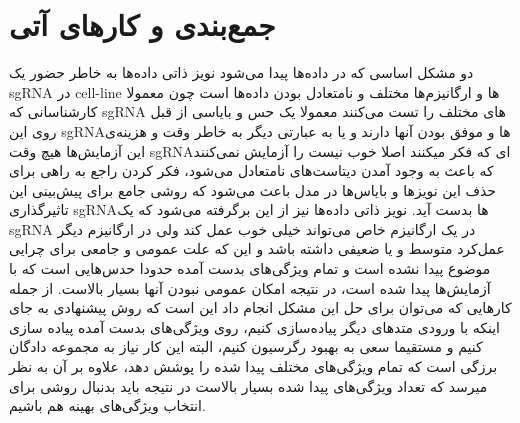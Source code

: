 \documentclass[12pt,a4paper,BCOR=.7cm,headsepline,bibliography=totoc]{report}
\begin{document}
\chapter{جمع‌بندی و کار‌های آتی}
دو مشکل اساسی که در داده‌ها پیدا می‌شود نویز ذاتی داده‌ها به خاطر حضور یک sgRNA در cell-line ها و ارگانیزم‌ها مختلف و نامتعادل بودن داده‌ها است چون معمولا کارشناسانی که sgRNA های مختلف را تست می‌کنند معمولا یک حس و بایاسی از قبل روی این sgRNAها و موفق بودن آنها دارند و یا به عبارتی دیگر به خاطر وقت و هزینه‌ی این آزمایش‌ها هیچ وقت sgRNAای که فکر میکنند اصلا خوب نیست را آزمایش نمی‌کنند که باعث به وجود آمدن دیتاست‌های نامتعادل می‌شود، فکر کردن راجع به راهی برای حذف این نویز‌ها و بایاس‌ها در مدل باعث می‌شود که روشی جامع برای پیش‌بینی این تاثیرگذاری sgRNAها بدست آید. نویز ذاتی داده‌ها نیز از این برگرفته می‌شود که یک sgRNA در یک ارگانیزم خاص می‌تواند خیلی خوب عمل کند ولی در ارگانیزم دیگر عمل‌کرد متوسط و یا ضعیفی داشته باشد و این که علت عمومی و جامعی برای چرایی موضوع پیدا نشده است و تمام ویژگی‌های بدست آمده حدودا حدس‌هایی است که با آزمایش‌ها پیدا شده است، در نتیجه امکان عمومی نبودن آنها بسیار بالاست. از جمله کار‌هایی که می‌توان برای حل این مشکل انجام داد این است که روش پیشنهادی به جای اینکه با ورودی متد‌های دیگر پیاده‌سازی کنیم، روی ویژگی‌های بدست آمده پیاده سازی کنیم و مستقیما سعی به بهبود رگرسیون کنیم، البته این کار نیاز به مجموعه دادگان برزگی است که تمام ویژگی‌های مختلف پیدا شده را پوشش دهد، علاوه بر آن به نظر میرسد که تعداد ویژگی‌های پیدا شده بسیار بالاست در نتیجه باید بدنبال روشی برای انتخاب ویژگی‌های بهینه هم باشیم.
\end{document}
